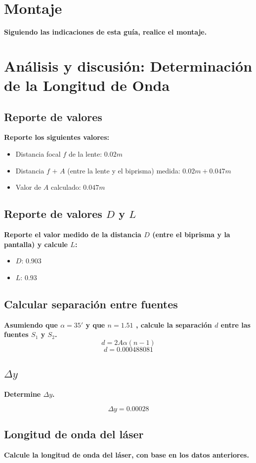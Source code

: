 \section{Montaje}
\textbf{Siguiendo las indicaciones de esta guía, realice el montaje.}

\section{Análisis y discusión: Determinación de la Longitud de Onda}

\subsection{Reporte de valores}
\textbf{Reporte los siguientes valores:}
\begin{itemize}
  \item Distancia focal $f$ de la lente: $0.02m$
  \item Distancia $f$ $+$ $A$ (entre la lente y el biprisma) medida: $0.02m + 0.047m$
  \item Valor de $A$ calculado: $0.047m$
\end{itemize}

\subsection{Reporte de valores $D$ y $L$}
\textbf{Reporte el valor medido de la distancia $D$ (entre el biprisma y la pantalla) y calcule $L$:}
\begin{itemize}
  \item $D$: $0.903$
  \item $L$: $0.93$
\end{itemize}

\subsection{Calcular separación entre fuentes}
\textbf{Asumiendo que $\alpha = 35\prime$ y que $n = 1.51$ , calcule la
separación $d$ entre las fuentes $S_{1}$ y $S_{2}$.}
\[ d = 2A\alpha(n-1) \]
\[ d = 0.000488081 \]

\subsection{$\Delta$$y$}
\textbf{Determine $\Delta$$y$.}

\[ \Delta y = 0.00028 \]


\subsection{Longitud de onda del láser}
\textbf{Calcule la longitud de onda del láser, con base en los datos anteriores.}

